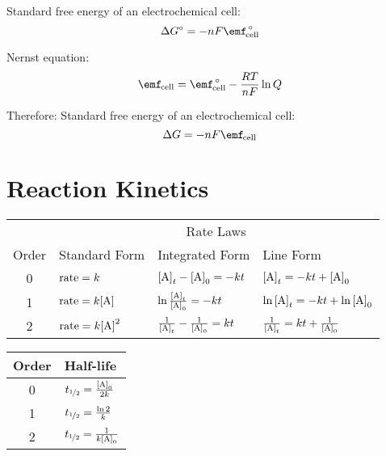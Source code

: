 \documentclass[10pt]{article}
\begin{document}
Standard free energy of an electrochemical cell:
\begin{equation*}
\Delta G\not = -nF\textnormal{\Enotcell}
\end{equation*}

Nernst equation:
\begin{equation*}
\textnormal{\Ecell} = \textnormal{\Enotcell} - \frac{RT}{nF}\ln Q
\end{equation*}

Therefore:
Standard free energy of an electrochemical cell:
\begin{equation*}
\Delta G = -nF\textnormal{\Ecell}
\end{equation*}

\section{Reaction Kinetics}

\begin{table}[H]
    \centering
        \begin{tabular}{clll}
            \toprule
                \multicolumn{1}{c}{} & \multicolumn{3}{c}{Rate Laws}\\
                \cmidrule(l){2-4} 
                Order & Standard Form & Integrated Form & Line Form \\
                \midrule
                0 & $\textnormal{rate}=k$ & $\textnormal{[A]}_t-\textnormal{[A]}_0=-kt$ & $\textnormal{[A]}_t=-kt+\textnormal{[A]}_0$   \\[10pt]
                1 & $\textnormal{rate}=k\textnormal{[A]}$ & $\ln\frac{\textnormal{[A]}_t}{\textnormal{[A]}_0}=-kt$ & $\ln\textnormal{[A]}_t=-kt+\ln\textnormal{[A]}_0$  \\[10pt]
                2 & $\textnormal{rate}=k\textnormal{[A]}^2$ & $\frac{1}{\textnormal{[A]}_t}-\frac{1}{\textnormal{[A]}_0}=kt$ & $\frac{1}{\textnormal{[A]}_t}=kt+\frac{1}{\textnormal{[A]}_0}$  \\
            \bottomrule
        \end{tabular}
    \label{tabrate}
\end{table}
\vspace*{-5pt}
\begin{table}[H]
    \centering
        \begin{tabular}{cl}
            \toprule
                Order & Half-life\\
                \midrule
                0 & $t_{\nicefrac{1}{2}}=\frac{\textnormal{[A]}_0}{2k}$ \\[10pt]
                1 & $t_{\nicefrac{1}{2}}=\frac{\ln 2}{k}$  \\[10pt]
                2 & $t_{\nicefrac{1}{2}}=\frac{1}{k\textnormal{[A]}_0}$  \\
            \bottomrule
        \end{tabular}
    \label{tabhalf}
\end{table}
\end{document}
